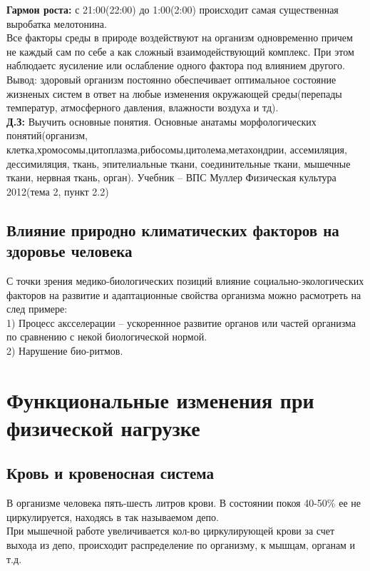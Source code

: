 \documentclass[a4paper, 12pt]{article}
\begin{document}
\textbf{Гармон роста:} с 21:00(22:00) до 1:00(2:00) происходит самая существенная выробатка мелотонина.\\

Все факторы среды в природе воздействуют на организм одновременно причем не каждый сам по себе а как сложный взаимодействующий комплекс. При этом наблюдаетс яусиление или ослабление одного фактора под влиянием другого.\\

Вывод: здоровый организм постоянно обеспечивает оптимальное состояние жизненых систем в ответ на любые изменения окружающей среды(перепады температур, атмосферного давления, влажности воздуха и тд).\\

\textbf{Д.З:}
 Выучить основные понятия. Основные анатамы морфологических понятий(организм, клетка,хромосомы,цитоплазма,рибосомы,цитолема,метахондрии, ассемиляция, дессимиляция, ткань, эпителиальные ткани, соединительные ткани, мышечные ткани, нервная ткань, орган). Учебник -- ВПС Муллер Физическая культура 2012(тема 2, пункт 2.2)\\

\subsection{Влияние природно климатических факторов на здоровье человека}

С точки зрения медико-биологических позиций влияние социально-экологических факторов на развитие и адаптационные свойства организма можно расмотреть на след примере:\\
1) Процесс аксселерации -- ускореннное развитие органов или частей организма по сравнению с некой биологической нормой.\\
2) Нарушение био-ритмов.\\

\section*{Функциональные изменения при физической нагрузке}
\subsection*{Кровь и кровеносная система}
В организме человека пять-шесть литров крови. В состоянии покоя 40-50\% ее не циркулируется, находясь в так называемом депо.\\

При мышечной работе увеличивается кол-во циркулирующей крови за счет выхода из депо, происходит распределение по организму, к мышцам, органам и т.д.\\
\end{document}
